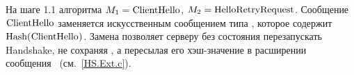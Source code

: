 \begin{note*}
На шаге 1.1 алгоритма $M_1=\code{ClientHello}$, $M_2=\code{HelloRetryRequest}$.
%
Сообщение $\code{ClientHello}$ заменяется искусственным сообщением типа 
, которое содержит $\code{Hash}(\code{ClientHello})$.
%
Замена позволяет серверу без состояния перезапускать Handshake, не сохраняя 
, а пересылая его хэш-значение в расширении 
 сообщения~ 
(см.~\ref{HS.Ext.c}).
\end{note*}

